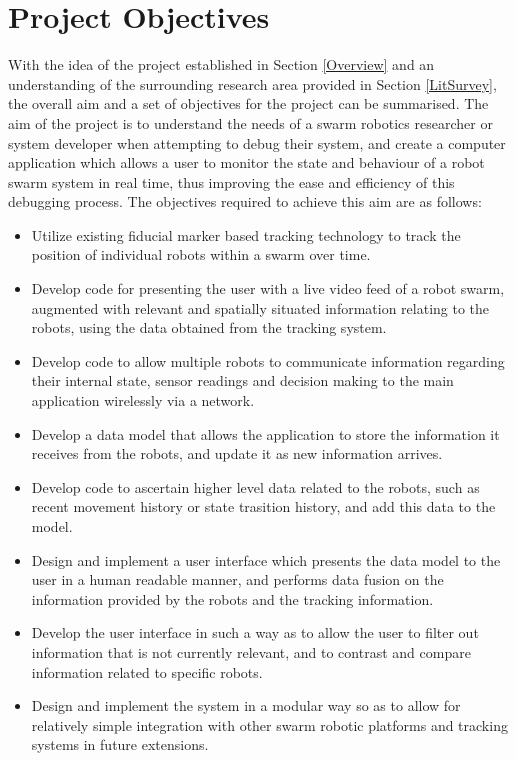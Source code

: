 \documentclass[titlepage,hidelinks,10pt]{article}
\begin{document}
\newpage
\section{Project Objectives} \label{Objectives}
With the idea of the project established in Section \ref{Overview} and an understanding of the surrounding research area provided in Section \ref{LitSurvey}, the overall aim and a set of objectives for the project can be summarised. The aim of the project is to understand the needs of a swarm robotics researcher or system developer when attempting to debug their system, and create a computer application which allows a user to monitor the state and behaviour of a robot swarm system in real time, thus improving the ease and efficiency of this debugging process. The objectives required to achieve this aim are as follows:

\begin{itemize}
	\item Utilize existing fiducial marker based tracking technology to track the position of individual robots within a swarm over time.
	\item Develop code for presenting the user with a live video feed of a robot swarm, augmented with relevant and spatially situated information relating to the robots, using the data obtained from the tracking system.
	\item Develop code to allow multiple robots to communicate information regarding their internal state, sensor readings and decision making to the main application wirelessly via a network.
	\item Develop a data model that allows the application to store the information it receives from the robots, and update it as new information arrives.
	\item Develop code to ascertain higher level data related to the robots, such as recent movement history or state trasition history, and add this data to the model.
	\item Design and implement a user interface which presents the data model to the user in a human readable manner, and performs data fusion on the information provided by the robots and the tracking information.
	\item Develop the user interface in such a way as to allow the user to filter out information that is not currently relevant, and to contrast and compare information related to specific robots.
	\item Design and implement the system in a modular way so as to allow for relatively simple integration with other swarm robotic platforms and tracking systems in future extensions.
\end{itemize}
\end{document}
